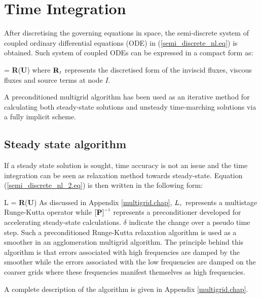 %
%
%
%
%
%
\section{Time Integration}
\label{time_integration_nonlinear.section}
%
 After discretising the governing equations in space, the semi-discrete system of
 coupled ordinary differential equations (ODE) in (\ref{semi_discrete_nl.eq}) 
 is obtained. Such system of coupled ODEs can be expressed in a compact
 form as:

%
\beq
     = {\bf R}\left({\bf U}\right)
\label{semi_discrete_nl_2.eq}
\eeq
%
 where ${\bf R}_{\mbox{\tiny $I$}}$ represents the discretised form of the inviscid fluxes,
 viscous fluxes and source terms at node $I$.

 A preconditioned multigrid algorithm has been used as an iterative
 method for calculating both steady-state solutions and
 unsteady time-marching solutions via a fully implicit scheme.
%
%
\subsection{Steady state algorithm}
%
 If a steady state solution is sought, time accuracy is not an issue and
 the time integration can be seen as relaxation method towards steady-state.
 Equation (\ref{semi_discrete_nl_2.eq}) is then written in the following
 form:

%
\beq
  \left[{\bf P}\right]L\sm{\tau}  =
  {\bf R}\left({\bf U}\right)
  \label{time_steadystate.eq}
\eeq
%
 As discussed in Appendix \ref{multigrid.chap}, $L_{\mbox{\tiny $\tau$}}$ represents
 a multistage Runge-Kutta operator while $\left[{\bf P}\right]^{\mbox{\tiny $-1$}}$
 represents a preconditioner developed for accelerating steady-state
 calculations. $\delta$ indicate the change over a pseudo time step.
 Such a preconditioned Runge-Kutta relaxation algorithm is used as
 a smoother in an agglomeration multigrid algorithm.
 The principle behind this algorithm is that errors associated with high
 frequencies are damped by the smoother while the errors associated
 with the low frequencies are damped on the coarser grids where these frequencies manifest
 themselves as high frequencies.

 A complete description of the algorithm is given in Appendix \ref{multigrid.chap}.
%
%
%
